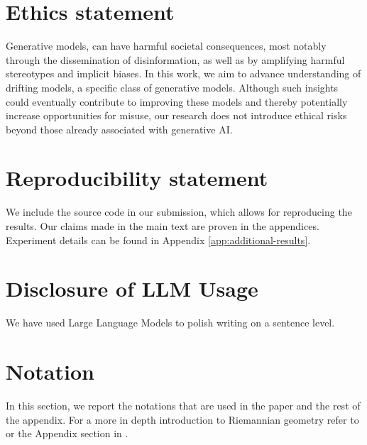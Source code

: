 \documentclass{article}
\theoremstyle{plain}
\begin{document}
\section*{Ethics statement}
Generative models, can have harmful societal consequences, most notably through the dissemination of disinformation, as well as by amplifying harmful stereotypes and implicit biases. In this work, we aim to advance understanding of drifting models, a specific class of generative models. Although such insights could eventually contribute to improving these models and thereby potentially increase opportunities for misuse, our research does not introduce ethical risks beyond those already associated with generative AI.
\section*{Reproducibility statement}
We include the source code in our submission, which allows for reproducing the results. Our claims made in the main text are proven in the appendices. Experiment details can be found in Appendix \ref{app:additional-results}.
\section*{Disclosure of LLM Usage}
We have used Large Language Models to polish writing on a sentence level.




\newpage
\appendix
\newpage
\section{Notation}

In this section, we report the notations that are used in the paper and the rest of the appendix. For a more in depth introduction to Riemannian geometry refer to \citep{lee2018riemannian} or the Appendix section in \citep{Zaghen2025RiemannianVariationalFlowMatching}.
\end{document}
